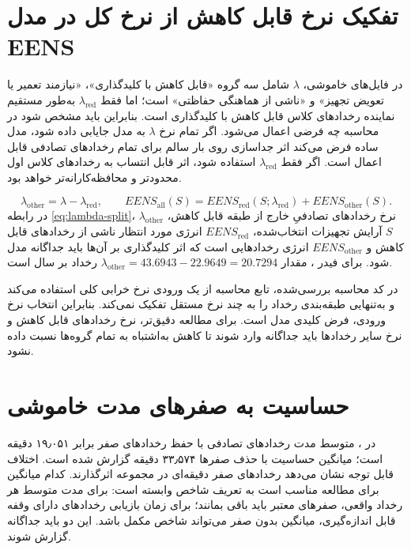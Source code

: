 \documentclass[11pt,a4paper,oneside]{book}
\newcommand{\file}[1]{\lr{\texttt{#1}}}
\newcommand{\code}[1]{\lr{\texttt{#1}}}
\begin{document}
\section{تفکیک نرخ قابل کاهش از نرخ کل در مدل EENS}
در فایل‌های خاموشی، $\lambda$ شامل سه گروه «قابل کاهش با کلیدگذاری»، «نیازمند تعمیر یا تعویض تجهیز» و «ناشی از هماهنگی حفاظتی» است؛ اما فقط $\lambda_{\mathrm{red}}$ به‌طور مستقیم نماینده رخدادهای کلاس قابل کاهش با کلیدگذاری است. بنابراین باید مشخص شود در محاسبه  چه فرضی اعمال می‌شود. اگر تمام نرخ $\lambda$ به مدل جایابی داده شود، مدل ساده فرض می‌کند اثر جداسازی روی بار سالم برای تمام رخدادهای تصادفی قابل اعمال است. اگر فقط $\lambda_{\mathrm{red}}$ استفاده شود، اثر قابل انتساب به رخدادهای کلاس اول محدودتر و محافظه‌کارانه‌تر خواهد بود.

\begin{equation}
 \lambda_{\mathrm{other}}=\lambda-\lambda_{\mathrm{red}},\qquad
 EENS_{\mathrm{all}}(S)=EENS_{\mathrm{red}}(S;\lambda_{\mathrm{red}})+EENS_{\mathrm{other}}(S).
 \label{eq:lambda-split}
\end{equation}
در رابطه \eqref{eq:lambda-split}، $\lambda_{\mathrm{other}}$ نرخ رخدادهای تصادفیِ خارج از طبقه قابل کاهش، $S$ آرایش تجهیزات انتخاب‌شده، $EENS_{\mathrm{red}}$ انرژی مورد انتظار ناشی از رخدادهای قابل کاهش و $EENS_{\mathrm{other}}$ انرژی رخدادهایی است که اثر کلیدگذاری بر آن‌ها باید جداگانه مدل شود. برای فیدر \code{F5}، مقدار $\lambda_{\mathrm{other}}=43.6943-22.9649=20.7294$ رخداد بر سال است.

در کد محاسبه  بررسی‌شده، تابع محاسبه از یک ورودی نرخ خرابی کلی استفاده می‌کند و به‌تنهایی طبقه‌بندی رخداد را به چند نرخ مستقل تفکیک نمی‌کند. بنابراین انتخاب نرخ ورودی، فرض کلیدی مدل است. برای مطالعه دقیق‌تر، نرخ رخدادهای قابل کاهش و نرخ سایر رخدادها باید جداگانه وارد شوند تا کاهش  به‌اشتباه به تمام گروه‌ها نسبت داده نشود.

\section{حساسیت به صفرهای مدت خاموشی}
در \file{5.xlsx}، متوسط مدت رخدادهای تصادفی با حفظ رخدادهای صفر برابر ۱۹٫۰۵۱ دقیقه است؛ میانگین حساسیت با حذف صفرها ۳۳٫۵۷۴ دقیقه گزارش شده است. اختلاف قابل توجه نشان می‌دهد رخدادهای صفر دقیقه‌ای در مجموعه اثرگذارند. کدام میانگین برای مطالعه مناسب است به تعریف شاخص وابسته است: برای مدت متوسط هر رخداد واقعی، صفرهای معتبر باید باقی بمانند؛ برای زمان بازیابی رخدادهای دارای وقفه قابل اندازه‌گیری، میانگین بدون صفر می‌تواند شاخص مکمل باشد. این دو باید جداگانه گزارش شوند.
\end{document}
